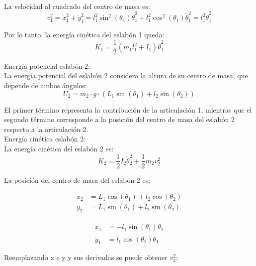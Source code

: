 La velocidad al cuadrado del centro de masa es:
\begin{equation}
v_1^2 = \dot{x}_1^2 + \dot{y}_1^2 = l_1^2\sin^2(\theta_1)\dot{\theta}_1^2 + l_1^2\cos^2(\theta_1)\dot{\theta}_1^2 = l_1^2\dot{\theta}_1^2
\end{equation}

Por lo tanto, la energía cinética del eslabón 1 queda:
\begin{equation}
K_1 = \frac{1}{2}(m_1l_1^2 + I_1)\dot{\theta}_1^2
\end{equation}

Energía potencial eslabón 2:\\
\noindent
La energía potencial del eslabón 2 considera la altura de su centro de masa, que depende de ambos ángulos:
\begin{equation}
U_2 = m_2 \cdot g \cdot (L_1 \sin(\theta_1) + l_2 \sin(\theta_2))
\end{equation}

El primer término representa la contribución de la articulación 1, mientras que el segundo término corresponde a la posición del centro de masa del eslabón 2 respecto a la articulación 2.\\

Energía cinética eslabón 2:\\
\noindent
La energía cinética del eslabón 2 es:
\begin{equation}
K_2 = \frac{1}{2} I_2 \dot{\theta}_2^2 + \frac{1}{2} m_2 v_2^2
\end{equation}

La posición del centro de masa del eslabón 2 es: \\
\noindent
\begin{minipage}{0.48\textwidth}
\begin{align}
x_2 &= L_1\cos(\theta_1) + l_2\cos(\theta_2) \\
y_2 &= L_1\sin(\theta_1) + l_2\sin(\theta_2)
\end{align}
\end{minipage}
\hfill
\begin{minipage}{0.48\textwidth}
\begin{align}
\dot{x}_1 &= -l_1 \sin(\theta_1) \dot{\theta}_1 \\
\dot{y}_1 &= l_1 \cos(\theta_1) \dot{\theta}_1
\end{align}
\end{minipage} 

Reemplazando x e y y sus derivadas se puede obtener $v_2^2$:

